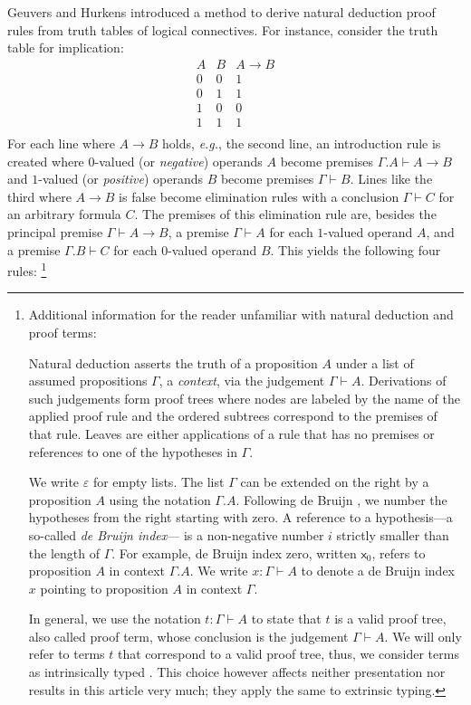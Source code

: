 \documentclass[a4paper,USenglish,cleveref, autoref, thm-restate]{lipics-v2019}
\newcommand{\eg}{\emph{e.g.}\xspace}
\newcommand{\Ge}{\ensuremath{\varepsilon}}
\newcommand{\x}{\mathsf{x}}
\begin{document}
Geuvers and Hurkens \cite{geuversHurkens:icla17} introduced a method to derive natural
deduction proof rules from truth tables of logical connectives.
For instance, consider the truth table for implication:
\[
\begin{array}{cc|c}
  A & B & A \to B \\
\hline
  0 & 0 & 1 \\
  0 & 1 & 1 \\
  1 & 0 & 0 \\
  1 & 1 & 1 \\
\end{array}
\]
For each line where $A \to B$ holds, \eg, the second line, an
introduction rule is created where $0$-valued (or \emph{negative})
operands $A$ become premises $\Gamma.A \vdash A \to B$ and $1$-valued
(or \emph{positive}) operands $B$ become premises $\Gamma \vdash B$.
Lines like the third where $A \to B$ is false become elimination rules
with a conclusion $\Gamma \vdash C$ for an arbitrary formula $C$.
The premises of this elimination rule are,
besides the principal premise $\Gamma \vdash A \to B$,
a premise $\Gamma \vdash A$ for each $1$-valued operand $A$, and
a premise $\Gamma.B \vdash C$ for each $0$-valued operand $B$.
This yields the following four rules:%
%
\footnote{%
Additional information for the reader unfamiliar with natural deduction and proof terms:
\par
Natural deduction asserts the truth of a proposition $A$
  under a list of assumed propositions $\Gamma$, a \emph{context}, via the
  judgement $\Gamma \vdash A$.  Derivations of such judgements
  form proof trees where nodes are labeled by the name of
  the applied proof rule and the ordered subtrees correspond to the premises
  of that rule.  Leaves are either applications of a rule that has no
  premises or references to one of the hypotheses in $\Gamma$.
\par
  We write $\Ge$ for empty lists.
  The list $\Gamma$ can be extended on the right by a proposition $A$
  using the notation $\Gamma.A$.  Following de Bruijn
  \cite{deBruijn:nameless}, we number the hypotheses from the right
  starting with zero.
  A reference to a hypothesis---a so-called \emph{de Bruijn index}---
  is a
  non-negative number $i$ strictly smaller than the length of $\Gamma$.
  For example, de Bruijn index zero, written $\x_0$,
  refers to proposition $A$ in context $\Gamma.A$.  We write $x :
  \Gamma \vdash A$ to denote a de Bruijn index $x$ pointing to
  proposition $A$ in context $\Gamma$.
\par
  In general, we use the notation $t : \Gamma \vdash A$ to state that
  $t$ is a valid proof tree, also called proof term, whose conclusion
  is the judgement $\Gamma \vdash A$.  We will only refer to terms $t$
  that correspond to a valid proof tree, thus, we consider terms as
  intrinsically typed
  \cite{alti:monadic,bentonHurKennedyMcBride:jar12}.  This choice
  however affects neither presentation nor results in this article
  very much; they apply the same to extrinsic typing.
%
}%
\end{document}
